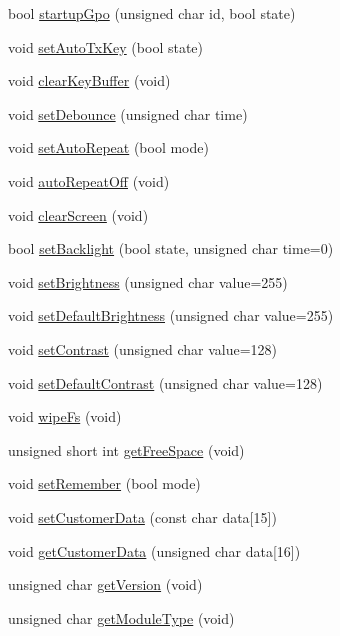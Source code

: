\begin{CompactItemize}
bool \hyperlink{classmoglk_b5a54b14d6bb193873f2309474778849}{startupGpo} (unsigned char id, bool state)
\item 
void \hyperlink{classmoglk_60acc221e5d147e977aead13e60b9cc2}{setAutoTxKey} (bool state)
\item 
void \hyperlink{classmoglk_cf2b77285c9281037e194508041c1409}{clearKeyBuffer} (void)
\item 
void \hyperlink{classmoglk_39a75ecd8ae42aedc0c6fa94e29da5e2}{setDebounce} (unsigned char time)
\item 
void \hyperlink{classmoglk_7679c4288b4ff96cf0259dbda8a852e7}{setAutoRepeat} (bool mode)
\item 
void \hyperlink{classmoglk_cbeba932b129751d3980fccf9f462ef0}{autoRepeatOff} (void)
\item 
void \hyperlink{classmoglk_40044034e8cb0e4caa5c240865ab5b35}{clearScreen} (void)
\item 
bool \hyperlink{classmoglk_d3b82640c34684aad6105f915ab874a4}{setBacklight} (bool state, unsigned char time=0)
\item 
void \hyperlink{classmoglk_df864702b2368836b36a3888503e9040}{setBrightness} (unsigned char value=255)
\item 
void \hyperlink{classmoglk_2a1af82f5cef9e807e43e2a9fa2636e2}{setDefaultBrightness} (unsigned char value=255)
\item 
void \hyperlink{classmoglk_aef110fe43d65a957b0de17bde3b7436}{setContrast} (unsigned char value=128)
\item 
void \hyperlink{classmoglk_665a6e5ce6e0ba5b49a888e048bd4541}{setDefaultContrast} (unsigned char value=128)
\item 
void \hyperlink{classmoglk_de1cb00a156f01b9948b7ade18a6754b}{wipeFs} (void)
\item 
unsigned short int \hyperlink{classmoglk_8dc3413e387ae4df9e10e73bd97fbdc5}{getFreeSpace} (void)
\item 
void \hyperlink{classmoglk_a56976ce3e35fc312c11488a6c08cfdc}{setRemember} (bool mode)
\item 
void \hyperlink{classmoglk_fbbdba07a24998b82fa0690a6a4d5f31}{setCustomerData} (const char data\mbox{[}15\mbox{]})
\item 
void \hyperlink{classmoglk_75192d11f9a4e9abe2ba5b31c41ca772}{getCustomerData} (unsigned char data\mbox{[}16\mbox{]})
\item 
unsigned char \hyperlink{classmoglk_353d736b01087f171ceb14a7a01cd292}{getVersion} (void)
\item 
unsigned char \hyperlink{classmoglk_9fffd2e63880a4ea0ecf8e1d9f196668}{getModuleType} (void)

\end{CompactItemize}
